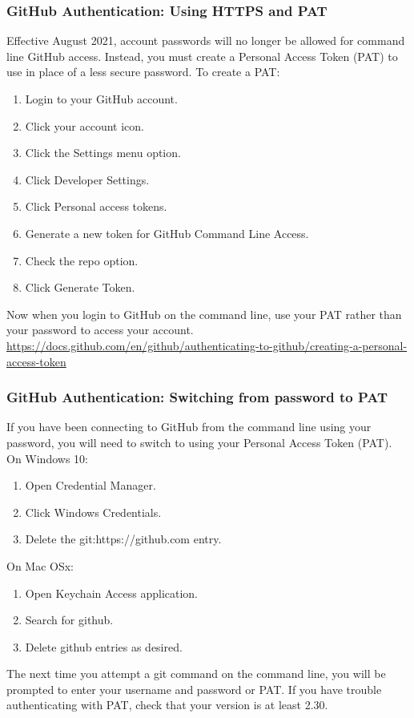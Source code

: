 \documentclass{beamer}
\begin{document}
\begin{frame}\frametitle{GitHub Authentication: Using HTTPS and PAT}
Effective August 2021, account passwords will no longer be allowed for command line GitHub access. Instead, you must create a Personal Access Token (PAT) to use in place of a less secure password.\newline\newline
To create a PAT:
\begin{enumerate}
\item Login to your GitHub account.
\item Click your account icon.
\item Click the Settings menu option.
\item Click Developer Settings.
\item Click Personal access tokens.
\item Generate a new token for GitHub Command Line Access.
\item Check the repo option.
\item Click Generate Token.
\end{enumerate}
\vspace{0.25cm}
Now when you login to GitHub on the command line, use your PAT rather than your password to access your account.\newline\newline
\url{https://docs.github.com/en/github/authenticating-to-github/creating-a-personal-access-token}
\end{frame}

\begin{frame}\frametitle{GitHub Authentication: Switching from password to PAT}
If you have been connecting to GitHub from the command line using your password, you will need to switch to using your Personal Access Token (PAT). \newline\newline
On Windows 10:
\begin{enumerate}
\item Open Credential Manager.
\item Click Windows Credentials.
\item Delete the git:https://github.com entry.
\end{enumerate}
\vspace{0.25cm}
On Mac OSx:
\begin{enumerate}
\item Open Keychain Access application.
\item Search for github.
\item Delete github entries as desired.
\end{enumerate}
\vspace{0.25cm}
The next time you attempt a git command on the command line,  you will be prompted to enter your username and password or PAT. If you have trouble authenticating with PAT, check that your version is at least 2.30.
\end{frame}
\end{document}
